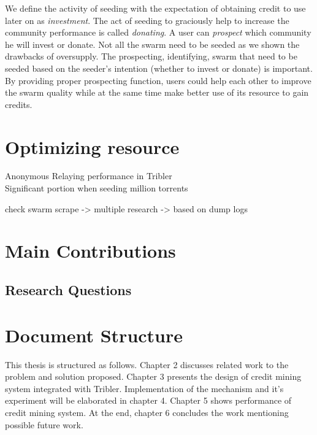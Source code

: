 We define the activity of seeding with the expectation of obtaining credit to use later on as \textit{investment}. The act of seeding to graciously help to increase the community performance is called \textit{donating}. A user can \textit{prospect} which community he will invest or donate. Not all the swarm need to be seeded as we shown the drawbacks of oversupply. The prospecting, identifying, swarm that need to be seeded based on the seeder's intention (whether to invest or donate) is important. By providing proper prospecting function, users could help each other to improve the swarm quality while at the same time make better use of its resource to gain credits. 


\section{Optimizing resource}

Anonymous Relaying performance in Tribler \cite{2015:onionroutetribler:stokkink}\\
Significant portion when seeding million torrents \cite{2012:milliontorrent:arvid}

check swarm scrape -> multiple research -> based on dump logs
\section{Main Contributions}

\subsection{Research Questions}

\section{Document Structure}
This thesis is structured as follows. Chapter 2 discusses related work to the problem and solution proposed. Chapter 3 presents the design of credit mining system integrated with Tribler. Implementation of the mechanism and it's experiment will be elaborated in chapter 4. Chapter 5 shows performance of credit mining system. At the end, chapter 6 concludes the work mentioning possible future work.
